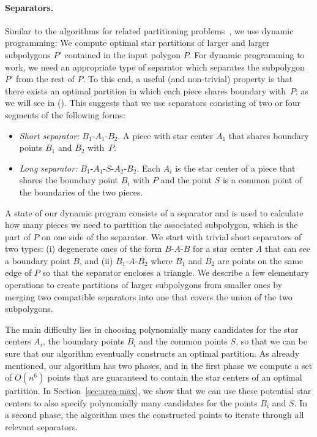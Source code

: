 \documentclass[10pt,a4paper]{article}
\begin{document}
\paragraph{Separators.}
Similar to the algorithms for related partitioning problems~\cite{chazelle1985optimal,DBLP:journals/siamcomp/Keil85}, we use dynamic programming:
We compute optimal star partitions of larger and larger subpolygons $P'$ contained in the input polygon $P$.
For dynamic programming to work, we need an appropriate type of separator which separates the subpolygon $P'$ from the rest of $P$.
To this end, a useful (and non-trivial) property is that there exists an optimal partition in which each piece shares boundary with~$P$; as we will see in  ().
This suggests that we use separators consisting of two or four segments of the following forms:

\begin{itemize}
\item \emph{Short separator:} $B_1$-$A_1$-$B_2$.
A piece with star center $A_1$ that shares boundary points $B_1$ and $B_2$ with~$P$.

\item \emph{Long separator:} $B_1$-$A_1$-$S$-$A_2$-$B_2$.
Each $A_i$ is the star center of a piece that shares the boundary point $B_i$ with $P$ and the point $S$ is a common point of the boundaries of the two pieces.
\end{itemize}

A state of our dynamic program consists of a separator and is used to calculate how many pieces we need to partition the associated subpolygon, which is the part of $P$ on one side of the separator.
We start with trivial short separators of two types: (i) degenerate ones of the form $B$-$A$-$B$ for a star center $A$ that can see a boundary point $B$, and (ii) $B_1$-$A$-$B_2$ where $B_1$ and $B_2$ are points on the same edge of $P$ so that the separator encloses a triangle.
We describe a few elementary operations to create partitions of larger subpolygons from smaller ones by merging two compatible separators into one that covers the union of the two subpolygons.

The main difficulty lies in choosing polynomially many candidates for the star centers $A_i$, the boundary points $B_i$ and the common points $S$, so that we can be sure that our algorithm eventually constructs an optimal partition.
As already mentioned, our algorithm has two phases, and in the first phase we compute a set of $O(n^6)$ points that are guaranteed to contain the star centers of an optimal partition. 
In Section~\ref{sec:area-max}, we show that we can use these potential star centers to also specify polynomially many candidates for the points $B_i$ and $S$.
In a second phase, the algorithm uses the constructed points to iterate through all relevant separators.
\end{document}
